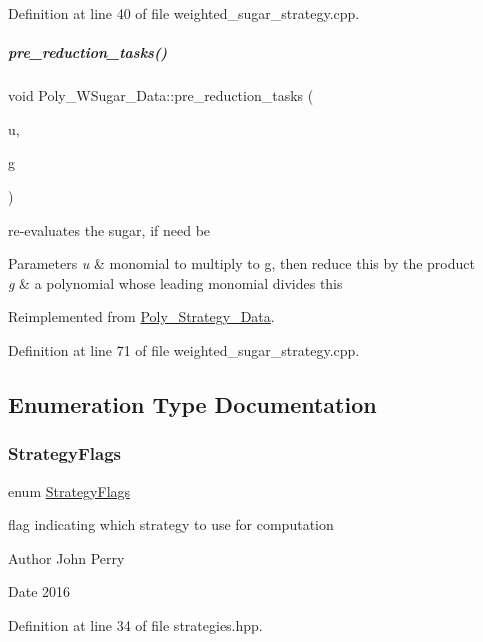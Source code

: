 Definition at line 40 of file weighted\+\_\+sugar\+\_\+strategy.\+cpp.

\mbox{\label{group__strategygroup_a4a34039eb50a2294d2aaf6245c1833b8}} 
\subparagraph{\texorpdfstring{pre\+\_\+reduction\+\_\+tasks()}{pre\_reduction\_tasks()}}
{\footnotesize\ttfamily void Poly\+\_\+\+W\+Sugar\+\_\+\+Data\+::pre\+\_\+reduction\+\_\+tasks (\begin{DoxyParamCaption}\item[{const E\+X\+P\+\_\+\+T\+Y\+PE $\ast$}]{u,  }\item[{const \hyperlink{group__polygroup_class_abstract___polynomial}{Abstract\+\_\+\+Polynomial} \&}]{g }\end{DoxyParamCaption})\hspace{0.3cm}{\ttfamily [virtual]}}



re-\/evaluates the sugar, if need be 


\begin{DoxyParams}{Parameters}
{\em u} & monomial to multiply to {\ttfamily g}, then reduce {\ttfamily this} by the product \\
\hline
{\em g} & a polynomial whose leading monomial divides {\ttfamily this} \\
\hline
\end{DoxyParams}


Reimplemented from \hyperlink{group__strategygroup_a0d71db50c58a24f48f94eae6a48c2149}{Poly\+\_\+\+Strategy\+\_\+\+Data}.



Definition at line 71 of file weighted\+\_\+sugar\+\_\+strategy.\+cpp.



\subsection{Enumeration Type Documentation}
\mbox{\label{group__strategygroup_ga0ee6c8e033547330e6b89929730007f4}} 
\subsubsection{\texorpdfstring{Strategy\+Flags}{StrategyFlags}}
{\footnotesize\ttfamily enum \hyperlink{group__strategygroup_ga0ee6c8e033547330e6b89929730007f4}{Strategy\+Flags}\hspace{0.3cm}{\ttfamily [strong]}}



flag indicating which strategy to use for computation 

\begin{DoxyAuthor}{Author}
John Perry 
\end{DoxyAuthor}
\begin{DoxyDate}{Date}
2016 
\end{DoxyDate}


Definition at line 34 of file strategies.\+hpp.

